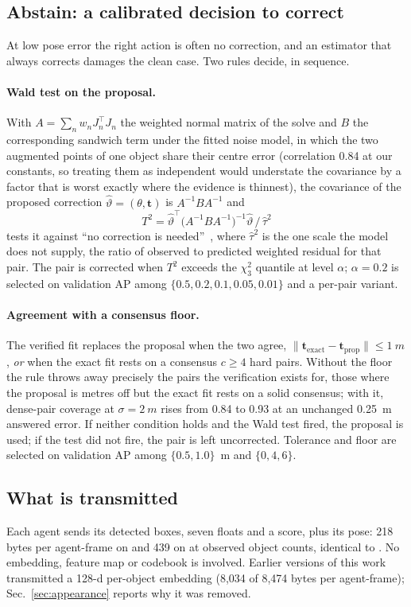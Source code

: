 \subsection{Abstain: a calibrated decision to correct}
\label{sec:abstain}
At low pose error the right action is often no correction, and an estimator that always corrects damages the clean case. Two rules decide, in sequence.

\paragraph{Wald test on the proposal.}
With $A=\sum_n w_n J_n^{\!\top}J_n$ the weighted normal matrix of the solve and $B$ the corresponding sandwich term under the fitted noise model, in which the two augmented points of one object share their centre error (correlation 0.84 at our constants, so treating them as independent would understate the covariance by a factor that is worst exactly where the evidence is thinnest), the covariance of the proposed correction $\hat\vartheta=(\theta,\mathbf{t})$ is $A^{-1}BA^{-1}$ and
\begin{equation}
T^2=\hat\vartheta^{\!\top}\!\big(A^{-1}BA^{-1}\big)^{-1}\hat\vartheta\,/\,\hat\tau^2
\label{eq:wald}
\end{equation}
tests it against ``no correction is needed''~\cite{wald1943tests}, where $\hat\tau^2$ is the one scale the model does not supply, the ratio of observed to predicted weighted residual for that pair. The pair is corrected when $T^2$ exceeds the $\chi^2_3$ quantile at level $\alpha$; $\alpha=0.2$ is selected on validation AP among $\{0.5,0.2,0.1,0.05,0.01\}$ and a per-pair variant.

\paragraph{Agreement with a consensus floor.}
The verified fit replaces the proposal when the two agree, $\lVert\mathbf{t}_{\mathrm{exact}}-\mathbf{t}_{\mathrm{prop}}\rVert\le\SI{1}{m}$, \emph{or} when the exact fit rests on a consensus $c\ge 4$ hard pairs. Without the floor the rule throws away precisely the pairs the verification exists for, those where the proposal is metres off but the exact fit rests on a solid consensus; with it, dense-pair coverage at $\sigma=\SI{2}{m}$ rises from 0.84 to 0.93 at an unchanged \SI{0.25}{m} answered error. If neither condition holds and the Wald test fired, the proposal is used; if the test did not fire, the pair is left uncorrected. Tolerance and floor are selected on validation AP among $\{0.5,1.0\}$~m and $\{0,4,6\}$.

\subsection{What is transmitted}
\label{sec:bytes}
Each agent sends its detected boxes, seven floats and a score, plus its pose: 218 bytes per agent-frame on \vxreal and 439 on \opvv at observed object counts, identical to \freealign. No embedding, feature map or codebook is involved. Earlier versions of this work transmitted a 128-d per-object embedding (8,034 of 8,474 bytes per agent-frame); Sec.~\ref{sec:appearance} reports why it was removed.
